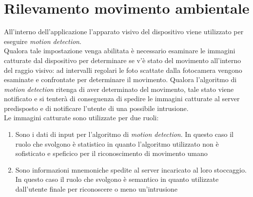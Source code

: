 \section{Rilevamento movimento ambientale}
All'interno dell'applicazione l'apparato visivo del dispositivo viene utilizzato per eseguire \textit{motion detection}.\\
Qualora tale impostazione venga abilitata è necessario esaminare le immagini catturate dal dispositivo per determinare se v'è stato del movimento all'interno del raggio visivo: ad intervalli regolari le foto scattate dalla fotocamera vengono esaminate e confrontate per determinare il movimento. Qualora l'algoritmo di \textit{motion detection} ritenga di aver determinato del movimento, tale stato viene notificato e si tenterà di conseguenza di spedire le immagini catturate al server predisposto e di notificare l'utente di una possibile intrusione.\\

\noindent Le immagini catturate sono utilizzate per due ruoli:
\begin{enumerate}
  \item Sono i dati di input per l'algoritmo di \textit{motion detection}. In questo caso il ruolo che svolgono è statistico in quanto l'algoritmo utilizzato non è sofisticato e speficico per il riconoscimento di movimento umano
  \item Sono informazioni mnemoniche spedite al server incaricato al loro stoccaggio. In questo caso il ruolo che svolgono è semantico in quanto utilizzate dall'utente finale per riconoscere o meno un'intrusione
\end{enumerate}

